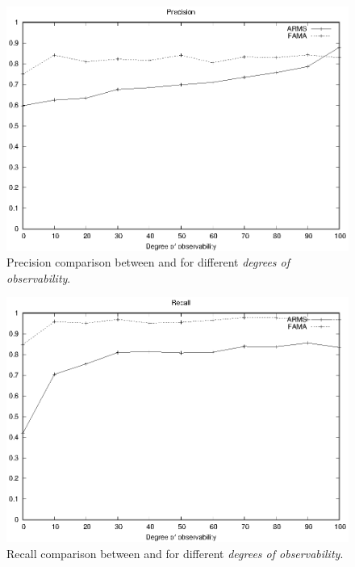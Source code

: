 \begin{figure}[hbt!]
	\centering
	\includegraphics[width=.65\linewidth]{figures/comparison_precision.eps}
	\caption{Precision comparison between \FAMA and \ARMS for different \emph{degrees of observability}.}
	\label{fig:comparison_precision}
\end{figure}

\begin{figure}[hbt!]
	\centering
	\includegraphics[width=.65\linewidth]{figures/comparison_recall.eps}
	\caption{Recall comparison between \FAMA and \ARMS for different \emph{degrees of observability}.}
	\label{fig:comparison_recall}
\end{figure}





